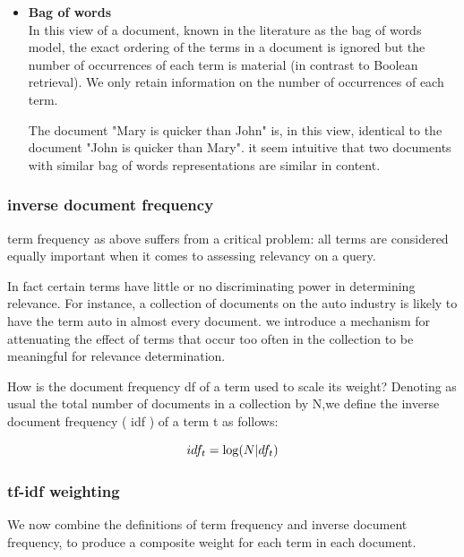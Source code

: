        

\begin{itemize}
     \item \textbf{Bag of words}\\
     In this view of a document, known in the literature as the bag
     of words model, the exact ordering of the terms in a document is ignored but
     the number of occurrences of each term is material (in contrast to Boolean
     retrieval). 
     We only retain information on the number of occurrences of each term. 
    
     The document "Mary is quicker than John" is, in this view, identical to the document "John is quicker than Mary". it seem intuitive that two documents with similar bag of words representations are
     similar in content.
\end{itemize} 

\subsubsection{inverse document frequency}

term frequency as above suffers from a critical problem: all terms are
considered equally important when it comes to assessing relevancy on a
query. 

In fact certain terms have little or no discriminating power in determining
relevance. For instance, a collection of documents on the auto
industry is likely to have the term auto in almost every document.
we introduce a mechanism for attenuating the effect of terms that occur
too often in the collection to be meaningful for relevance determination.


How is the document frequency df of a term used to scale its weight? 
Denoting as usual the total number of documents in a collection by N,we define the inverse document frequency ( idf ) of a term t as follows:

\begin{equation}
        \large 
            idf_{t} = \log (N | df_{t})\end{equation}

\subsubsection{tf-idf weighting}

We now combine the definitions of term frequency and inverse document
frequency, to produce a composite weight for each term in each document.

